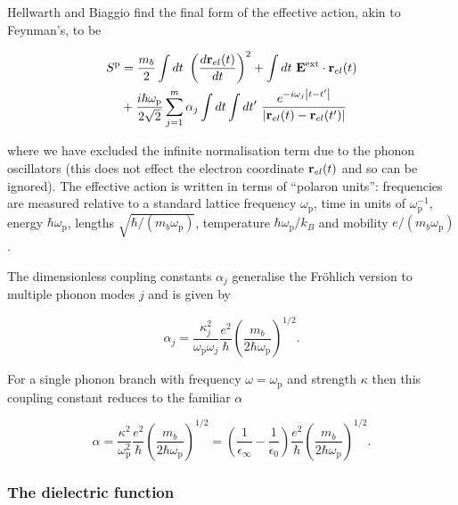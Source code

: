 Hellwarth and Biaggio find the final form of the effective action, akin to Feynman's, to be

\begin{equation}\label{eqn:HI_eff_action}
    \begin{aligned}
    S^{\text{p}} &= \frac{m_b}{2} \int dt\ \left( \frac{d\vb{r}_{el}(t)}{dt} \right)^2 + \int dt\ \vb{E}^{\text{ext}} \cdot \vb{r}_{el}(t) \\
    &+ \frac{i\hbar\omega_{\text{p}}}{2\sqrt{2}} \sum_{j = 1}^m \alpha_j \int dt \int dt'\ \frac{e^{-i\omega_j \abs{t-t'}}}{\abs{\vb{r}_{el}(t) - \vb{r}_{el}(t')}} 
    \end{aligned}
\end{equation}

where we have excluded the infinite normalisation term due to the phonon oscillators (this does not effect the electron coordinate $\vb{r}_{el}(t)$ and so can be ignored). The effective action is written in terms of ``polaron units'': frequencies are measured relative to a standard lattice frequency $\omega_{\text{p}}$, time in units of $\omega_{\text{p}}^{-1}$, energy $\hbar \omega_{\text{p}}$, lengths $\sqrt{\hbar/(m_b \omega_{\text{p}})}$, temperature $\hbar\omega_{\text{p}}/k_B$ and mobility $e/(m_b \omega_{\text{p}})$. 

The dimensionless coupling constants $\alpha_j$ generalise the Fr\"ohlich version to multiple phonon modes $j$ and is given by

\begin{equation}
    \alpha_j = \frac{\kappa_j^2}{\omega_{\text{p}} \omega_j} \frac{e^2}{\hbar} \left( \frac{m_b}{2 \hbar \omega_{\text{p}}} \right)^{1/2}.
\end{equation}

For a single phonon branch with frequency $\omega = \omega_{\text{p}}$ and strength $\kappa$ then this coupling constant reduces to the familiar $\alpha$

\begin{equation}
    \alpha = \frac{\kappa^2}{\omega^2_{\text{p}}} \frac{e^2}{\hbar} \left( \frac{m_b}{2\hbar\omega_{\text{p}}} \right)^{1/2} = \left( \frac{1}{\epsilon_\infty} - \frac{1}{\epsilon_0} \right) \frac{e^2}{\hbar} \left( \frac{m_b}{2\hbar\omega_{\text{p}}} \right)^{1/2}.
\end{equation}

\subsubsection{The dielectric function}
\label{subsubsec:2-3-3-4}


